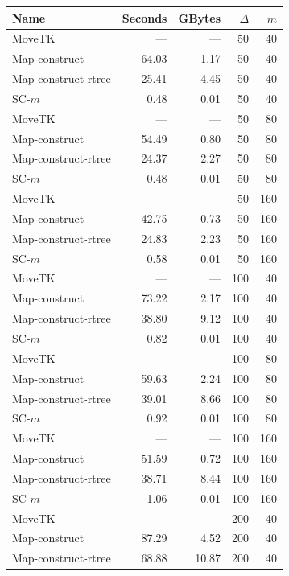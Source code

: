 
    \begin{figure} \begin{center}
    \begin{minipage}{0.5\textwidth}
    \begin{tabular}{@{}lrrrr@{}}
        \toprule
        Name & Seconds & GBytes & $\Delta$ & $m$\\
        \midrule
        MoveTK & --- & --- & 50 & 40\\
Map-construct & 64.03 & 1.17 & 50 & 40\\
Map-construct-rtree & 25.41 & 4.45 & 50 & 40\\
        \medskip
SC-$m$ & 0.48 & 0.01 & 50 & 40\\
        MoveTK & --- & --- & 50 & 80\\
Map-construct & 54.49 & 0.80 & 50 & 80\\
Map-construct-rtree & 24.37 & 2.27 & 50 & 80\\
        \medskip
SC-$m$ & 0.48 & 0.01 & 50 & 80\\
        MoveTK & --- & --- & 50 & 160\\
Map-construct & 42.75 & 0.73 & 50 & 160\\
Map-construct-rtree & 24.83 & 2.23 & 50 & 160\\
        \medskip
SC-$m$ & 0.58 & 0.01 & 50 & 160\\
        MoveTK & --- & --- & 100 & 40\\
Map-construct & 73.22 & 2.17 & 100 & 40\\
Map-construct-rtree & 38.80 & 9.12 & 100 & 40\\
        \medskip
SC-$m$ & 0.82 & 0.01 & 100 & 40\\
        MoveTK & --- & --- & 100 & 80\\
Map-construct & 59.63 & 2.24 & 100 & 80\\
Map-construct-rtree & 39.01 & 8.66 & 100 & 80\\
        \medskip
SC-$m$ & 0.92 & 0.01 & 100 & 80\\
        MoveTK & --- & --- & 100 & 160\\
Map-construct & 51.59 & 0.72 & 100 & 160\\
Map-construct-rtree & 38.71 & 8.44 & 100 & 160\\
        \medskip
SC-$m$ & 1.06 & 0.01 & 100 & 160\\
        MoveTK & --- & --- & 200 & 40\\
Map-construct & 87.29 & 4.52 & 200 & 40\\
Map-construct-rtree & 68.88 & 10.87 & 200 & 40\\

\end{tabular}
\end{minipage}
\end{center}
\end{figure}
